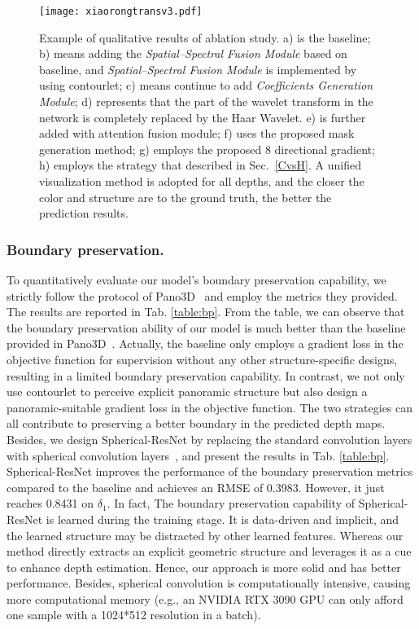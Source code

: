 \documentclass[10pt,times,mathptm,psfig,twocolumn,journals]{IEEEtran}
\begin{document}
\begin{figure*}[t]
\centering
\texttt{[image: xiaorongtransv3.pdf]}
\caption{Example of qualitative results of ablation study. a) is the baseline; b) means adding the \textit{Spatial–Spectral Fusion Module}  based on baseline, and \textit{Spatial–Spectral Fusion Module} is implemented by using contourlet; c) means continue to add \textit{Coefficients Generation Module}; d) represents that the part of the wavelet transform in the network is completely replaced by the Haar Wavelet. e) is further added with attention fusion module; f) uses the proposed mask generation method; g) employs the proposed 8 directional gradient; h) employs the strategy that described in Sec.~\ref{CvsH}. A unified visualization method is adopted for all depths, and the closer the color and structure are to the ground truth, the better the prediction results.}
\label{fig:abla}
\end{figure*}
\subsubsection{Boundary preservation.}
To quantitatively evaluate our model's boundary preservation capability, we strictly follow the protocol of Pano3D~\cite{albanis2021pano3d} and employ the metrics they provided. The results are reported in Tab. \ref{table:bp}. From the table, we can observe that the boundary preservation ability of our model is much better than the baseline provided in Pano3D~\cite{albanis2021pano3d}. Actually, the baseline only employs a gradient loss in the objective function for supervision without any other structure-specific designs, resulting in a limited boundary preservation capability. In contrast, we not only use contourlet to perceive explicit panoramic structure but also design a panoramic-suitable gradient loss in the objective function. The two strategies can all contribute to preserving a better boundary in the predicted depth maps. 
Besides, we design Spherical-ResNet by replacing the standard convolution layers with spherical convolution layers~\cite{cohen2018spherical}, and present the results in Tab. \ref{table:bp}. Spherical-ResNet improves the performance of the boundary preservation metrics compared to the baseline and achieves an RMSE of 0.3983. However, it just reaches 0.8431 on $\delta_{1}$. In fact, The boundary preservation capability of Spherical-ResNet is learned during the training stage. It is data-driven and implicit, and the learned structure may be distracted by other learned features. Whereas our method directly extracts an explicit geometric structure and leverages it as a cue to enhance depth estimation. Hence, our approach is more solid and has better performance. Besides, spherical convolution is computationally intensive, causing more computational memory (e.g., an NVIDIA RTX 3090 GPU can only afford one sample with a 1024*512 resolution in a batch).
\end{document}
